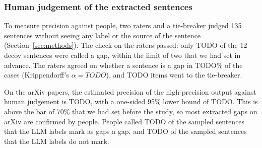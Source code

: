 \newcommand{\hsDecoyYes}{TODO}        %
\newcommand{\hsDisputed}{TODO}        %
\newcommand{\hsArxivPrec}{TODO}       %
\newcommand{\hsArxivLower}{TODO}      %
\newcommand{\hsSTwoYes}{TODO}         %
\newcommand{\hsSTwoShare}{TODO}       %
\newcommand{\hsSTwoP}{TODO}           %
\newcommand{\hsSalLim}{TODO}          %
\newcommand{\hsSalAny}{TODO}          %
\newcommand{\hsAgreeGap}{TODO}        %
\newcommand{\hsAlphaGap}{TODO}        %
\newcommand{\hsBTwoShare}{TODO}       %
\newcommand{\hsBOneShare}{TODO}       %

\subsubsection{Human judgement of the extracted sentences}
\label{sec:human-study}

To measure precision against people, two raters and a tie-breaker judged 135 sentences without seeing any label or the source of the sentence (Section~\ref{sec:methods}). The check on the raters passed: only \hsDecoyYes{} of the 12 decoy sentences were called a gap, within the limit of two that we had set in advance. The raters agreed on whether a sentence is a gap in \hsAgreeGap\% of the cases (Krippendorff's $\alpha = \hsAlphaGap$), and \hsDisputed{} items went to the tie-breaker.

On the arXiv papers, the estimated precision of the high-precision output against human judgement is \hsArxivPrec, with a one-sided 95\% lower bound of \hsArxivLower. This is above the bar of 70\% that we had set before the study, so most extracted gaps on arXiv are confirmed by people.
People called \hsBTwoShare{} of the sampled sentences that the LLM labels mark as gaps a gap, and \hsBOneShare{} of the sampled sentences that the LLM labels do not mark.

